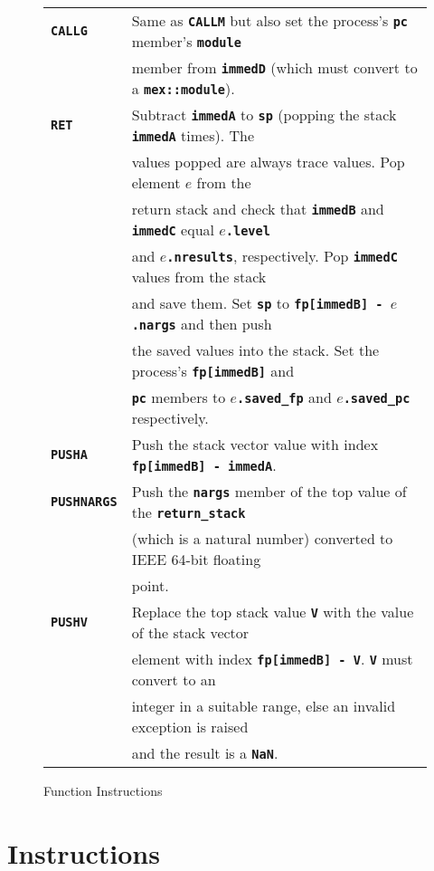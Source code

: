 \documentclass[12pt]{article}
\newcommand{\TT}[1]{{\tt \bfseries #1}}
\newlength{\figurewidth}
\newenvironment{boxedfigure}[1][!btp]%
	{\begin{figure*}[#1]
	 \begin{lrbox}{\figurebox}
	 \begin{minipage}{\figurewidth}

	 \vspace*{1ex}}%
	{
	 \vspace*{1ex}

	 \end{minipage}
	 \end{lrbox}

	 \centering
	 \fbox{\hspace*{0.1in}\usebox{\figurebox}\hspace*{0.1in}}
	 \end{figure*}}
\begin{document}
\begin{boxedfigure}
\begin{center}
\begin{tabular}{|l|l|}
\\\hline
\TT{CALLG}
    & Same as \TT{CALLM} but also set the process's \TT{pc} member's 
                                                           \TT{module} \\
    & member from \TT{immedD} (which must convert to a \TT{mex::module}).
\\\hline
\TT{RET}
    & Subtract \TT{immedA} to \TT{sp} (popping the stack \TT{immedA} times).
      The \\
    & values popped are always trace values.  Pop element $e$ from the \\
    & return stack and check that \TT{immedB} and \TT{immedC} equal
      \TT{$e$.level} \\
    & and \TT{$e$.nresults}, respectively.  Pop \TT{immedC} values from
      the stack \\
    & and save them.  Set \TT{sp} to \TT{fp[immedB] - $e$.nargs} and then push \\
    & the saved values into the stack.  Set the process's \TT{fp[immedB]} and \\
    & \TT{pc} members to \TT{$e$.saved\_fp} and \TT{$e$.saved\_pc}
      respectively.
\\\hline
\TT{PUSHA}
    & Push the stack vector value with index \TT{fp[immedB] - immedA}.
\\\hline
\TT{PUSHNARGS}
    & Push the \TT{nargs} member of the top value of the \TT{return\_stack} \\
    & (which is a natural number) converted to IEEE 64-bit floating \\
    & point.
\\\hline
\TT{PUSHV}
    & Replace the top stack value \TT{V} with the value of the stack vector \\
    & element with index \TT{fp[immedB] - V}.  \TT{V} must convert to an \\
    & integer in a suitable range, else an invalid exception is raised \\
    & and the result is a \TT{NaN}.
\\\hline
\end{tabular}
\end{center}
\caption{Function Instructions}
\label{FUNCTION-INSTRUCTIONS}
\end{boxedfigure}

\clearpage

\section{Instructions}
\label{INSTRUCTIONS}
\end{document}
